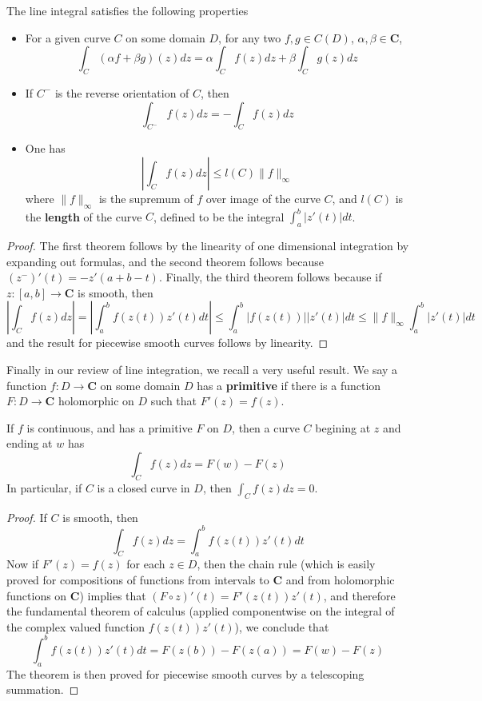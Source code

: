 \begin{theorem}
    The line integral satisfies the following properties
    \begin{itemize}
        \item For a given curve $C$ on some domain $D$, for any two $f,g \in C(D)$, $\alpha, \beta \in \mathbf{C}$,
        \[ \int_C (\alpha f + \beta g)(z) dz = \alpha \int_C f(z) dz + \beta \int_C g(z) dz \]

        \item If $C^-$ is the reverse orientation of $C$, then
        \[ \int_{C^-} f(z) dz = - \int_C f(z) dz \]

        \item One has
        \[ \left| \int_C f(z) dz \right| \leq l(C) \| f \|_\infty \]
        where $\| f \|_\infty$ is the supremum of $f$ over image of the curve $C$, and $l(C)$ is the {\bf length} of the curve $C$, defined to be the integral $\int_a^b |z'(t)| dt$.
    \end{itemize}
\end{theorem}
\begin{proof}
    The first theorem follows by the linearity of one dimensional integration by expanding out formulas, and the second theorem follows because $(z^-)'(t) = -z'(a+b-t)$. Finally, the third theorem follows because if $z: [a,b] \to \mathbf{C}$ is smooth, then
    \[ \left| \int_C f(z)dz \right| = \left| \int_a^b f(z(t)) z'(t) dt \right| \leq \int_a^b |f(z(t))||z'(t)| dt \leq \| f \|_\infty \int_a^b |z'(t)| dt \]
    and the result for piecewise smooth curves follows by linearity.
\end{proof}

Finally in our review of line integration, we recall a very useful result. We say a function $f: D \to \mathbf{C}$ on some domain $D$ has a {\bf primitive} if there is a function $F: D \to \mathbf{C}$ holomorphic on $D$ such that $F'(z) = f(z)$.

\begin{theorem}
    If $f$ is continuous, and has a primitive $F$ on $D$, then a curve $C$ begining at $z$ and ending at $w$ has
    \[ \int_C f(z)dz = F(w) - F(z) \]
    In particular, if $C$ is a closed curve in $D$, then $\int_C f(z)dz = 0$.
\end{theorem}
\begin{proof}
    If $C$ is smooth, then
    \[ \int_C f(z)dz = \int_a^b f(z(t)) z'(t) dt \]
    Now if $F'(z) = f(z)$ for each $z \in D$, then the chain rule (which is easily proved for compositions of functions from intervals to $\mathbf{C}$ and from holomorphic functions on $\mathbf{C}$) implies that $(F \circ z)'(t) = F'(z(t)) z'(t)$, and therefore the fundamental theorem of calculus (applied componentwise on the integral of the complex valued function $f(z(t)) z'(t)$), we conclude that
    \[ \int_a^b f(z(t)) z'(t) dt = F(z(b)) - F(z(a)) = F(w) - F(z) \]
    The theorem is then proved for piecewise smooth curves by a telescoping summation.
\end{proof}

